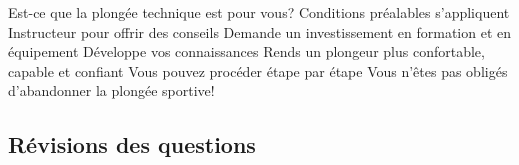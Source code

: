 \begin{frame}{\insertsubsection}
	\begin{outline}
		\1 Est-ce que la plongée technique est pour vous?
			\2 Conditions préalables s'appliquent
			\2 Instructeur pour offrir des conseils
			\2 Demande un investissement en formation et en équipement
			\2 Développe vos connaissances
			\2 Rends un plongeur plus confortable, capable et confiant
			\2 Vous pouvez procéder étape par étape
			\2 Vous n'êtes pas obligés d'abandonner la plongée sportive!
	\end{outline}
\end{frame}


\subsection{Révisions des questions}

